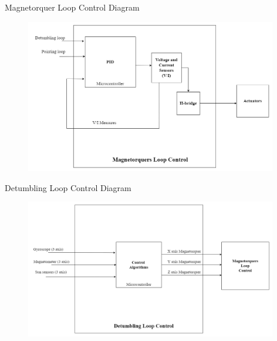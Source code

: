 \documentclass{beamer}
\begin{document}
\begin{frame}{Magnetorquer Loop Control Diagram}

    \begin{figure}[!ht]
        \begin{center}
            \includegraphics[width=11cm]{figures/Malha_Magnetorquers.drawio (1).png}
        \end{center}
    \end{figure}

\end{frame}

\begin{frame}{Detumbling Loop Control Diagram}

    \begin{figure}[!ht]
        \begin{center}
            \includegraphics[width=11cm]{figures/Malha_Detumbling.drawio.png}
        \end{center}
    \end{figure}

\end{frame}
\end{document}
